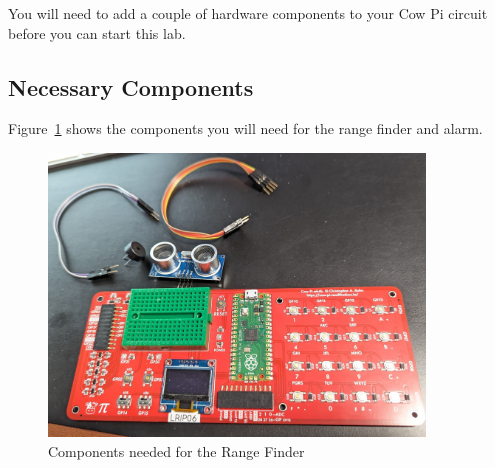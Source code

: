 You will need to add a couple of hardware components to your Cow Pi circuit before you can start this lab.

\subsection{Necessary Components}

Figure~\ref{fig:components-mk4b} shows the components you will need for the range finder and alarm.

\begin{figure}
    \centering
    \includegraphics[width=10cm]{hardware/mk4b/components} %
    \caption{Components needed for the Range Finder \label{fig:components-mk4b}}
\end{figure}

